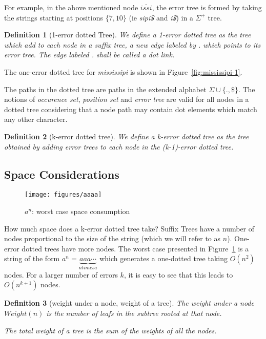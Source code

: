 \documentclass[letter,10pt]{article}
\newcommand{\putstring}[1]{\textsl{#1}}
\newtheorem{definition}{Definition}
\begin{document}
For example, in the above mentioned node $\overline{issi}$, the error tree is formed by taking the strings starting at positions $\{7, 10\}$ (ie \putstring{sipi\$} and \putstring{i\$}) in a $\Sigma^+$ tree.

\begin{definition}[1-error dotted Tree]
We define a \emph{1-error dotted tree} as the tree which add to each node in a suffix tree, a new edge labeled by \putstring{.} which points to its error tree. The edge labeled \putstring{.} shall be called a \emph{dot link}.
\end{definition}

The one-error dotted tree for \putstring{mississipi} is shown in Figure~\ref{fig:mississipi-1}.

The paths in the dotted tree are paths in the extended alphabet $\Sigma\cup\{.,\$\}$. The notions of \emph{occurence set}, \emph{position set} and \emph{error tree} are valid for all nodes in a dotted tree considering that a node path may contain dot elements which match any other character.

\begin{definition}[k-error dotted tree]
We define a k-error dotted tree as the tree obtained by adding error trees to each node in the (k-1)-error dotted tree.
\end{definition}

\subsection{Space Considerations}

\begin{figure}
\texttt{[image: figures/aaaa]}
\caption{$a^n$: worst case space consumption}%
\label{fig:aaaa}
\end{figure}


How much space does a k-error dotted tree take? Suffix Trees have a number of nodes proportional to the size of the string (which we will refer to as $n$). One-error dotted trees have more nodes. The worst case presented in Figure~\ref{fig:aaaa} is a string of the form $a^n = \underbrace{aaa\cdots}_{n \mathit{times }a}$ which generates a one-dotted tree taking $O(n^2)$ nodes. For a larger number of errors $k$, it is easy to see that this leads to $O(n^{k+1})$ nodes.

\begin{definition}[weight under a node, weight of a tree]
The weight under a node $\mathit{Weight}(n)$ is the number of leafs in the subtree rooted at that node.

The total weight of a tree is the sum of the weights of all the nodes.
\end{definition}
\end{document}
